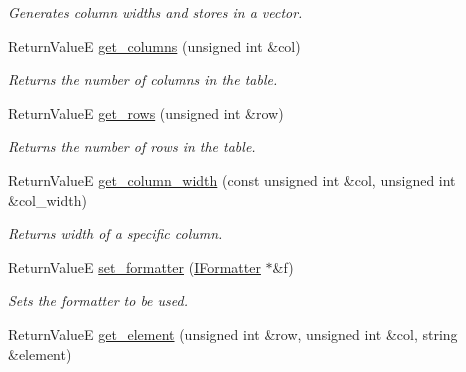 \begin{DoxyCompactItemize}
\begin{DoxyCompactList}\small\item\em Generates column widths and stores in a vector. \end{DoxyCompactList}\item 
\hypertarget{classTable_a570d9a50965036c614d2328dde1dfe8e}{}Return\+Value\+E \hyperlink{classTable_a570d9a50965036c614d2328dde1dfe8e}{get\+\_\+columns} (unsigned int \&col)\label{classTable_a570d9a50965036c614d2328dde1dfe8e}

\begin{DoxyCompactList}\small\item\em Returns the number of columns in the table. \end{DoxyCompactList}\item 
\hypertarget{classTable_aecd59c6e6420a2833de9cd6dc3df5be8}{}Return\+Value\+E \hyperlink{classTable_aecd59c6e6420a2833de9cd6dc3df5be8}{get\+\_\+rows} (unsigned int \&row)\label{classTable_aecd59c6e6420a2833de9cd6dc3df5be8}

\begin{DoxyCompactList}\small\item\em Returns the number of rows in the table. \end{DoxyCompactList}\item 
\hypertarget{classTable_ad3cb46364300d9f97655e6d628333c43}{}Return\+Value\+E \hyperlink{classTable_ad3cb46364300d9f97655e6d628333c43}{get\+\_\+column\+\_\+width} (const unsigned int \&col, unsigned int \&col\+\_\+width)\label{classTable_ad3cb46364300d9f97655e6d628333c43}

\begin{DoxyCompactList}\small\item\em Returns width of a specific column. \end{DoxyCompactList}\item 
\hypertarget{classTable_a4b480f91c567559b09ffcca9b41b38cd}{}Return\+Value\+E \hyperlink{classTable_a4b480f91c567559b09ffcca9b41b38cd}{set\+\_\+formatter} (\hyperlink{classIFormatter}{I\+Formatter} $\ast$\&f)\label{classTable_a4b480f91c567559b09ffcca9b41b38cd}

\begin{DoxyCompactList}\small\item\em Sets the formatter to be used. \end{DoxyCompactList}\item 
\hypertarget{classTable_ad0da3c76a9efeded5081ac73e81fb282}{}Return\+Value\+E \hyperlink{classTable_ad0da3c76a9efeded5081ac73e81fb282}{get\+\_\+element} (unsigned int \&row, unsigned int \&col, string \&element)\label{classTable_ad0da3c76a9efeded5081ac73e81fb282}


\end{DoxyCompactItemize}
